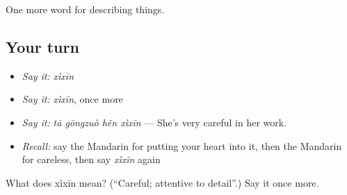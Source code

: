 \begin{grammarlens}[title={What you've built}]
One more word for describing things.
\end{grammarlens}

\subsection*{Your turn}
\begin{itemize}
\raggedright
  \item \emph{Say it:} \emph{xìxīn}
  \item \emph{Say it:} \emph{xìxīn}, once more
  \item \emph{Say it:} \emph{tā gōngzuò hěn xìxīn} — She's very careful in her work.
  \item \emph{Recall:} say the Mandarin for putting your heart into it, then the Mandarin for careless, then say \emph{xìxīn} again
\end{itemize}

\begin{tcolorbox}[breakable,colback=teal!4,colframe=teal!35!black,title={Before you move on}]
What does xìxīn mean? (\textquotedblleft{}Careful; attentive to detail\textquotedblright{}.) Say it once more.
\end{tcolorbox}
